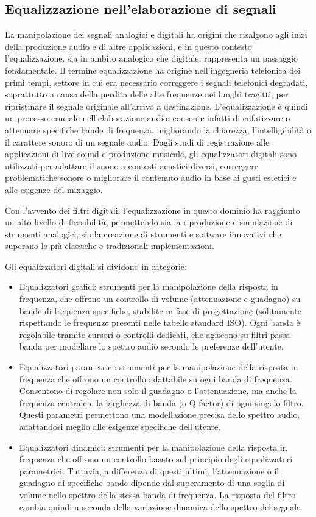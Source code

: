 \documentclass[12pt]{report}
\begin{document}
\subsection{Equalizzazione nell'elaborazione di segnali}
La manipolazione dei segnali analogici e digitali ha origini che risalgono agli inizi della produzione audio e di altre applicazioni, e in questo contesto l’equalizzazione, sia in ambito analogico che digitale, rappresenta un passaggio fondamentale.
Il termine equalizzazione ha origine nell'ingegneria telefonica dei primi tempi, settore in cui era necessario correggere i segnali telefonici degradati, soprattutto a causa della perdita delle alte frequenze nei lunghi tragitti, per ripristinare il segnale originale all'arrivo a destinazione.
L'equalizzazione è quindi un processo cruciale nell'elaborazione audio: consente infatti di enfatizzare o attenuare specifiche bande di frequenza, migliorando la chiarezza, l'intelligibilità o il carattere sonoro di un segnale audio. Dagli studi di registrazione alle applicazioni di live sound e produzione musicale, gli equalizzatori digitali sono utilizzati per adattare il suono a contesti acustici diversi, correggere problematiche sonore o migliorare il contenuto audio in base ai gusti estetici e alle esigenze del mixaggio.

Con l’avvento dei filtri digitali, l’equalizzazione in questo dominio ha raggiunto un alto livello di flessibilità, permettendo sia la riproduzione e simulazione di strumenti analogici, sia la creazione di strumenti e software innovativi che superano le 
più classiche e tradizionali implementazioni.

Gli equalizzatori digitali si dividono in categorie:
\begin{itemize}
    \item Equalizzatori grafici: strumenti per la manipolazione della risposta in frequenza, che offrono un controllo di volume (attenuazione e guadagno) su bande di frequenza specifiche, stabilite in fase di progettazione (solitamente rispettando le frequenze presenti nelle tabelle standard ISO). Ogni banda è regolabile tramite cursori o controlli dedicati, che agiscono su filtri passa-banda per modellare lo spettro audio secondo le preferenze dell'utente.
    \item Equalizzatori parametrici: strumenti per la manipolazione della risposta in frequenza che offrono un controllo adattabile su ogni banda di frequenza. Consentono di regolare non solo il guadagno o l'attenuazione, ma anche la frequenza centrale e la larghezza di banda (o Q factor) di ogni singolo filtro. Questi parametri permettono una modellazione precisa dello spettro audio, adattandosi meglio alle esigenze specifiche dell'utente.
    \item Equalizzatori dinamici: strumenti per la manipolazione della risposta in frequenza che offrono un controllo basato sul principio degli equalizzatori parametrici. Tuttavia, a differenza di questi ultimi, l'attenuazione o il guadagno di specifiche bande dipende dal superamento di una soglia di volume nello spettro della stessa banda di frequenza. La risposta del filtro cambia quindi a seconda della variazione dinamica dello spettro del segnale.
\end{itemize}
\end{document}

